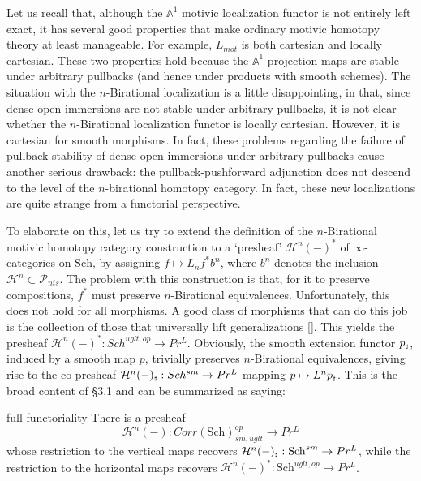 Let us recall that, although the $\mathbb{A}^1$ motivic localization functor is not entirely left exact, it has several good properties that make ordinary motivic homotopy theory at least manageable. For example, $L_{mot}$ is both cartesian and locally cartesian. These two properties hold because the $\mathbb{A}^1$ projection maps are stable under arbitrary pullbacks (and hence under products with smooth schemes). The situation with the $n$-Birational localization is a little disappointing, in that, since dense open immersions are not stable under arbitrary pullbacks, it is not clear whether the $n$-Birational localization functor is locally cartesian. However, it is cartesian for smooth morphisms. In fact, these problems regarding the failure of pullback stability of dense open immersions under arbitrary pullbacks cause another serious drawback: the pullback-pushforward adjunction does not descend to the level of the $n$-birational homotopy category. In fact, these new localizations are quite strange from a functorial perspective.

To elaborate on this, let us try to extend the definition of the $n$-Birational motivic homotopy category construction to a `presheaf' $\mathcal{H}^{n}(-)^*$ of $\infty$-categories on $\mathrm{Sch}$, by assigning $f\mapsto L_{n}f^*b^n$, where $b^n$ denotes the inclusion $\mathcal{H}^n\subset \mathcal{P}_{nis}$. The problem with this construction is that, for it to preserve compositions, $f^*$ must preserve $n$-Birational equivalences. Unfortunately, this does not hold for all morphisms. A good class of morphisms that can do this job is the collection of those that universally lift generalizations []. This yields the presheaf $\mathcal{H}^{n}(-)^*:Sch^{uglt,op}\to Pr^L$. Obviously, the smooth extension functor $p_{\mathord{\text{\tiny $\sharp$}}}$, induced by a smooth map $p$, trivially preserves $n$-Birational equivalences, giving rise to the co-presheaf $\mathcal{H}^n(-)_{\mathord{\text{\tiny $\sharp$}}}: Sch^{sm}\to Pr^L$ mapping $p\mapsto L^np_{\mathord{\text{\tiny $\sharp$}}}$. This is the broad content of \S3.1 and can be summarized as saying:
\begin{recall*}{full functoriality}
   There is a presheaf $$\mathcal{H}^n(-): Corr(\mathrm{Sch})_{sm,uglt}^{op}\to Pr^L$$ whose restriction to the vertical maps recovers $\mathcal{H}^n(-)_{\mathord{\text{\tiny $\sharp$}}}: \mathrm{Sch}^{sm}\to Pr^L$, while the restriction to the horizontal maps recovers $\mathcal{H}^{n}(-)^*: \mathrm{Sch}^{uglt,op}_{}\to Pr^L$.
\end{recall*}


